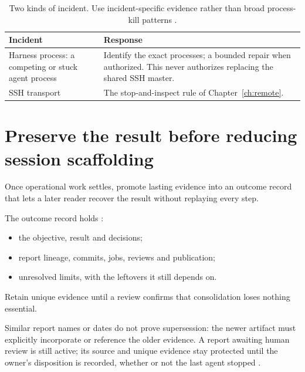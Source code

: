 \begin{table}[H]
  \small
  \begin{tabularx}{\textwidth}{L{0.26\textwidth}Y}
    \toprule
    Incident & Response \\
    \midrule
    Harness process: a competing or stuck agent process & Identify the exact processes; a
    bounded repair when authorized. This never authorizes replacing the shared SSH
    master. \\
    SSH transport & The stop-and-inspect rule of Chapter~\ref{ch:remote}. \\
    \bottomrule
  \end{tabularx}
  \caption{Two kinds of incident. Use incident-specific evidence rather than broad
    process-kill patterns \cite[SSH control masters]{skill:remote}.}
  \label{tab:recovery-incidents}
\end{table}


\section{Preserve the result before reducing session scaffolding}

\begin{headline}
  Once operational work settles, promote lasting evidence into an outcome record that lets
  a later reader recover the result without replaying every step.
\end{headline}

The outcome record holds \cite[When]{skill:lifecycle}:
\begin{itemize}
  \item the objective, result and decisions;
  \item report lineage, commits, jobs, reviews and publication;
  \item unresolved limits, with the leftovers it still depends on.
\end{itemize}
Retain unique evidence until a review confirms that consolidation loses nothing essential.

\begin{rulebox}[Supersession]
  Similar report names or dates do not prove supersession: the newer artifact must
  explicitly incorporate or reference the older evidence. A report awaiting human review is
  still active; its source and unique evidence stay protected until the owner's disposition
  is recorded, whether or not the last agent stopped \cite[Review and
    release]{skill:report-production}.
\end{rulebox}

